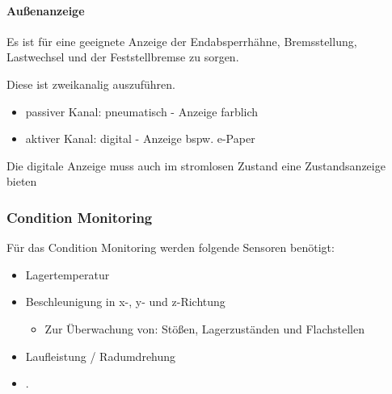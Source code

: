 \paragraph{Außenanzeige}
\begin{feat}
Es ist für eine geeignete Anzeige der Endabsperrhähne, Bremsstellung, Lastwechsel und der Feststellbremse zu sorgen.
\end{feat}
\begin{rem}[zu Anf. 25]
Diese ist zweikanalig auszuführen.
\begin{itemize}
    \item passiver Kanal: pneumatisch - Anzeige farblich
    \item aktiver Kanal: digital - Anzeige bspw. e-Paper
\end{itemize}
\end{rem}
\begin{feat}
Die digitale Anzeige muss auch im stromlosen Zustand eine Zustandsanzeige bieten
\end{feat}

\subsubsection{Condition Monitoring}
\begin{feat}
Für das Condition Monitoring werden folgende Sensoren benötigt:
\begin{itemize}
    \item Lagertemperatur
    \item Beschleunigung in x-, y- und z-Richtung
    \begin{itemize}
        \item Zur Überwachung von: Stößen, Lagerzuständen und Flachstellen
    \end{itemize}
    \item Laufleistung / Radumdrehung
    \item .
\end{itemize}
\end{feat}

\begin{comment}
\subsubsection{Sonstige Sensoren}
\begin{feat}
Weitere Benötigte Sensoren:
\begin{itemize}
    \item 
\end{itemize}
\end{feat}
\end{comment}

